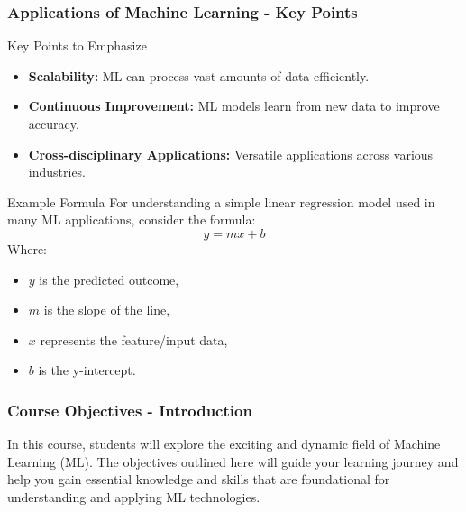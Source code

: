 \documentclass[aspectratio=169]{beamer}
\begin{document}
\begin{frame}[fragile]
    \frametitle{Applications of Machine Learning - Key Points}
    \begin{block}{Key Points to Emphasize}
        \begin{itemize}
            \item \textbf{Scalability:} ML can process vast amounts of data efficiently.
            \item \textbf{Continuous Improvement:} ML models learn from new data to improve accuracy.
            \item \textbf{Cross-disciplinary Applications:} Versatile applications across various industries.
        \end{itemize}
    \end{block}
    \begin{block}{Example Formula}
        For understanding a simple linear regression model used in many ML applications, consider the formula:
        \begin{equation} 
            y = mx + b 
        \end{equation}
        Where:
        \begin{itemize}
            \item \( y \) is the predicted outcome,
            \item \( m \) is the slope of the line,
            \item \( x \) represents the feature/input data,
            \item \( b \) is the y-intercept.
        \end{itemize}
    \end{block}
\end{frame}

\begin{frame}[fragile]
    \frametitle{Course Objectives - Introduction}
    In this course, students will explore the exciting and dynamic field of Machine Learning (ML).
    The objectives outlined here will guide your learning journey and help you gain essential knowledge and skills that are foundational for understanding and applying ML technologies.
\end{frame}
\end{document}
